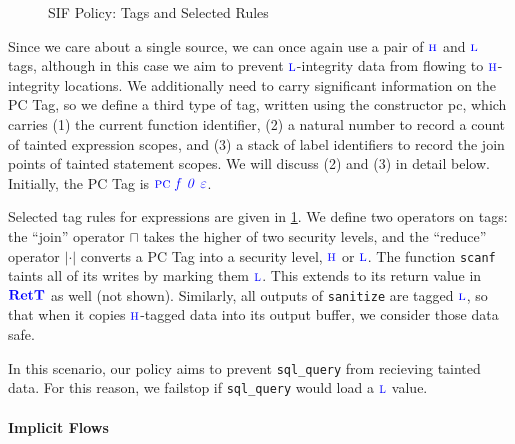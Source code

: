 \documentclass{llncs}
\begin{document}
{\begin{figure}
\begin{minipage}{0.45\textwidth}
  \end{minipage}

\caption{SIF Policy: Tags and Selected Rules}
\label{fig:sif1}
\end{figure}

Since we care about a single source, we can once again use a pair of \(\textnormal{\color{blue} \sc h}\)
and \(\textnormal{\color{blue} \sc l}\) tags, although in this case we aim to prevent \(\textnormal{\color{blue} \sc l}\)-integrity
data from flowing to \(\textnormal{\color{blue} \sc h}\)-integrity locations.
We additionally need to carry significant information on the PC Tag,
so we define a third type of tag, written using the constructor {\sc \color{blue} pc},
which carries (1) the current function identifier, (2) a natural number to record
a count of tainted expression scopes, and (3) a stack of label identifiers to record
the join points of tainted statement scopes. We will discuss (2) and (3) in detail below.
Initially, the PC Tag is \(\textnormal{\sc \color{blue} pc} \mathit{\color{blue} ~ f ~ 0 ~ \varepsilon}\).

Selected tag rules for expressions are given in \cref{fig:sif1}. We define two operators on tags:
the ``join'' operator \(\sqcap\) takes the higher of two security levels, and the ``reduce''
operator \(| \cdot |\) converts a PC Tag into a security level, \(\textnormal{\color{blue} \sc h}\) or \(\textnormal{\color{blue} \sc l}\).
The function {\tt scanf} taints all of its writes by marking them \(\textnormal{\color{blue} \sc l}\).  This extends to
its return value in \(\color{blue} \mathbf{RetT}\) as well (not shown).
Similarly, all outputs of {\tt sanitize} are tagged \(\textnormal{\color{blue} \sc l}\), so that when it copies \(\textnormal{\color{blue} \sc h}\)-tagged data into its
output buffer, we consider those data safe.

In this scenario, our policy aims to prevent {\tt sql\_query} from recieving tainted data.
For this reason, we failstop if {\tt sql\_query} would load a \(\textnormal{\color{blue} \sc l}\) value.

\paragraph*{Implicit Flows}

}
\end{document}

